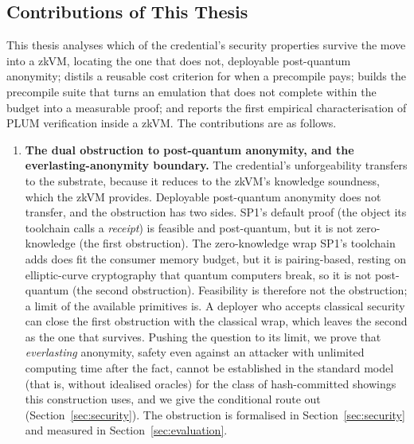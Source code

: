 \subsection{Contributions of This Thesis}
This thesis analyses which of the credential's security properties survive the move into a zkVM, locating the one that does not, deployable post-quantum anonymity; distils a reusable cost criterion for when a precompile pays; builds the precompile suite that turns an emulation that does not complete within the budget into a measurable proof; and reports the first empirical characterisation of PLUM verification inside a zkVM. The contributions are as follows.

\begin{enumerate}
  \item \textbf{The dual obstruction to post-quantum anonymity, and the everlasting-anonymity boundary.} The credential's unforgeability transfers to the substrate, because it reduces to the zkVM's knowledge soundness, which the zkVM provides. Deployable post-quantum anonymity does not transfer, and the obstruction has two sides. SP1's default proof (the object its toolchain calls a \emph{receipt}) is feasible and post-quantum, but it is not zero-knowledge (the first obstruction). The zero-knowledge wrap SP1's toolchain adds does fit the consumer memory budget, but it is pairing-based, resting on elliptic-curve cryptography that quantum computers break, so it is not post-quantum (the second obstruction). Feasibility is therefore not the obstruction; a limit of the available primitives is. A deployer who accepts classical security can close the first obstruction with the classical wrap, which leaves the second as the one that survives. Pushing the question to its limit, we prove that \emph{everlasting} anonymity, safety even against an attacker with unlimited computing time after the fact, cannot be established in the standard model (that is, without idealised oracles) for the class of hash-committed showings this construction uses, and we give the conditional route out (Section~\ref{sec:security}). The obstruction is formalised in Section~\ref{sec:security} and measured in Section~\ref{sec:evaluation}.


\end{enumerate}
